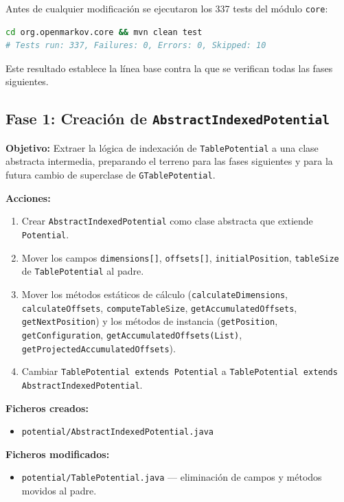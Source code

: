 \documentclass[11pt,a4paper]{article}
\newcommand{\code}[1]{\texttt{#1}}
\begin{document}
Antes de cualquier modificación se ejecutaron los 337 tests del módulo
\code{core}:

\begin{lstlisting}[language=bash, caption={Verificación de la línea base}]
cd org.openmarkov.core && mvn clean test
# Tests run: 337, Failures: 0, Errors: 0, Skipped: 10
\end{lstlisting}

Este resultado establece la línea base contra la que se verifican todas las
fases siguientes.

\subsection{Fase 1: Creación de \code{AbstractIndexedPotential}}

\textbf{Objetivo:} Extraer la lógica de indexación de \code{TablePotential} a
una clase abstracta intermedia, preparando el terreno para las fases siguientes y
para la futura cambio de superclase de \code{GTablePotential}.

\textbf{Acciones:}
\begin{enumerate}
  \item Crear \code{AbstractIndexedPotential} como clase abstracta que extiende
        \code{Potential}.
  \item Mover los campos \code{dimensions[]}, \code{offsets[]},
        \code{initialPosition}, \code{tableSize} de \code{Table\-Potential} al
        padre.
  \item Mover los métodos estáticos de cálculo (\code{calculate\-Dimensions},
        \code{calculate\-Offsets}, \code{compute\-Table\-Size},
        \code{get\-Accumulated\-Offsets}, \code{get\-Next\-Position}) y los métodos de
        instancia (\code{get\-Position}, \code{get\-Configuration},
        \code{get\-Accumulated\-Offsets(List)},
        \code{get\-Projected\-Accumulated\-Offsets}).
  \item Cambiar \code{TablePotential extends Potential} a
        \code{Table\-Potential extends Abstract\-Indexed\-Potential}.
\end{enumerate}

\textbf{Ficheros creados:}
\begin{itemize}
  \item \code{potential/AbstractIndexedPotential.java}
\end{itemize}

\textbf{Ficheros modificados:}
\begin{itemize}
  \item \code{potential/TablePotential.java} --- eliminación de campos y métodos
        movidos al padre.
\end{itemize}
\end{document}

